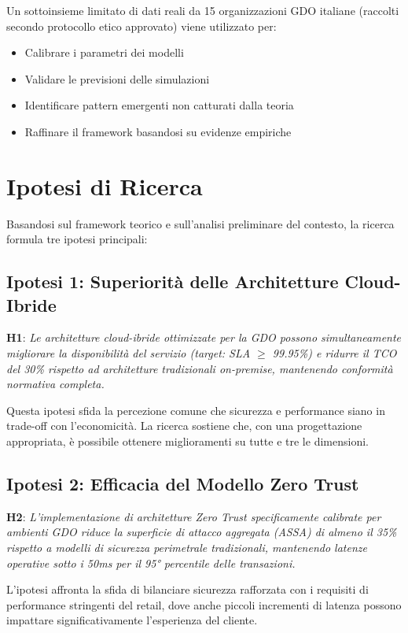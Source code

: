 \begin{bibunit}[IEEEtran]
Un sottoinsieme limitato di dati reali da 15 organizzazioni GDO italiane (raccolti secondo protocollo etico approvato) viene utilizzato per:
\begin{itemize}
\item Calibrare i parametri dei modelli
\item Validare le previsioni delle simulazioni
\item Identificare pattern emergenti non catturati dalla teoria
\item Raffinare il framework basandosi su evidenze empiriche
\end{itemize}

\section{Ipotesi di Ricerca}

Basandosi sul framework teorico e sull'analisi preliminare del contesto, la ricerca formula tre ipotesi principali:

\subsection{Ipotesi 1: Superiorità delle Architetture Cloud-Ibride}

\textbf{H1}: \textit{Le architetture cloud-ibride ottimizzate per la GDO possono simultaneamente migliorare la disponibilità del servizio (target: SLA $\geq$ 99.95\%) e ridurre il TCO del 30\% rispetto ad architetture tradizionali on-premise, mantenendo conformità normativa completa.}

Questa ipotesi sfida la percezione comune che sicurezza e performance siano in trade-off con l'economicità. La ricerca sostiene che, con una progettazione appropriata, è possibile ottenere miglioramenti su tutte e tre le dimensioni.

\subsection{Ipotesi 2: Efficacia del Modello Zero Trust}

\textbf{H2}: \textit{L'implementazione di architetture Zero Trust specificamente calibrate per ambienti GDO riduce la superficie di attacco aggregata (ASSA) di almeno il 35\% rispetto a modelli di sicurezza perimetrale tradizionali, mantenendo latenze operative sotto i 50ms per il 95° percentile delle transazioni.}

L'ipotesi affronta la sfida di bilanciare sicurezza rafforzata con i requisiti di performance stringenti del retail, dove anche piccoli incrementi di latenza possono impattare significativamente l'esperienza del cliente.


\end{bibunit}
